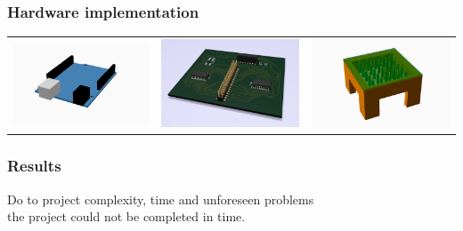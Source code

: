 \documentclass{beamer}
\begin{document}
\begin{frame}
    \frametitle{Hardware implementation}
    \begin{center}
        \begin{tabular}{ccc}
            \includegraphics[width=.33\textwidth]{img/arduino.png}&
            \includegraphics[width=.33\textwidth]{img/board.png}&
            \includegraphics[width=.33\textwidth]{img/foam_table.png}
        \end{tabular}
    \end{center}

\end{frame}

\begin{frame}
    \frametitle{Results}
    \begin{center}
        Do to project complexity, time and unforeseen problems\\
        the project could not be completed in time.
    \end{center}

\end{frame}
\end{document}
